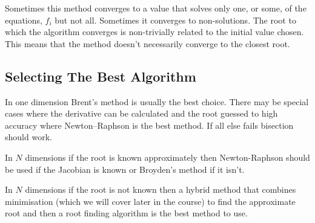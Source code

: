 \documentclass[a4paper]{article}
\begin{document}
    Sometimes this method converges to a value that solves only one, or some, of the equations, \(f_i\) but not all.
    Sometimes it converges to non-solutions.
    The root to which the algorithm converges is non-trivially related to the initial value chosen.
    This means that the method doesn't necessarily converge to the closest root.
    
    \subsection{Selecting The Best Algorithm}
    In one dimension Brent's method is usually the best choice.
    There may be special cases where the derivative can be calculated and the root guessed to high accuracy where Newton--Raphson is the best method.
    If all else fails bisection should work.
    
    In \(N\) dimensions if the root is known approximately then Newton-Raphson should be used if the Jacobian is known or Broyden's method if it isn't.
    
    In \(N\) dimensions if the root is not known then a hybrid method that combines minimisation (which we will cover later in the course) to find the approximate root and then a root finding algorithm is the best method to use.
    
\end{document}
